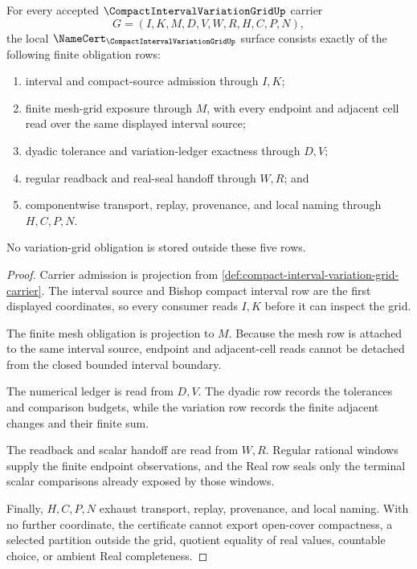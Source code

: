\begin{theorem}
\label{thm:compact-interval-variation-grid-namecert-obligations}
For every accepted $\CompactIntervalVariationGridUp$ carrier
$$
G=(I,K,M,D,V,W,R,H,C,P,N),
$$
the local $\NameCert_{\CompactIntervalVariationGridUp}$ surface consists exactly of the following finite obligation rows:
\begin{enumerate}
\item interval and compact-source admission through $I,K$;
\item finite mesh-grid exposure through $M$, with every endpoint and adjacent cell read over the same displayed interval source;
\item dyadic tolerance and variation-ledger exactness through $D,V$;
\item regular readback and real-seal handoff through $W,R$; and
\item componentwise transport, replay, provenance, and local naming through $H,C,P,N$.
\end{enumerate}
No variation-grid obligation is stored outside these five rows.
\end{theorem}
\begin{proof}
Carrier admission is projection from \autoref{def:compact-interval-variation-grid-carrier}. The interval source and Bishop compact interval row are the first displayed coordinates, so every consumer reads $I,K$ before it can inspect the grid.

The finite mesh obligation is projection to $M$. Because the mesh row is attached to the same interval source, endpoint and adjacent-cell reads cannot be detached from the closed bounded interval boundary.

The numerical ledger is read from $D,V$. The dyadic row records the tolerances and comparison budgets, while the variation row records the finite adjacent changes and their finite sum.

The readback and scalar handoff are read from $W,R$. Regular rational windows supply the finite endpoint observations, and the Real row seals only the terminal scalar comparisons already exposed by those windows.

Finally, $H,C,P,N$ exhaust transport, replay, provenance, and local naming. With no further coordinate, the certificate cannot export open-cover compactness, a selected partition outside the grid, quotient equality of real values, countable choice, or ambient Real completeness.
\end{proof}

